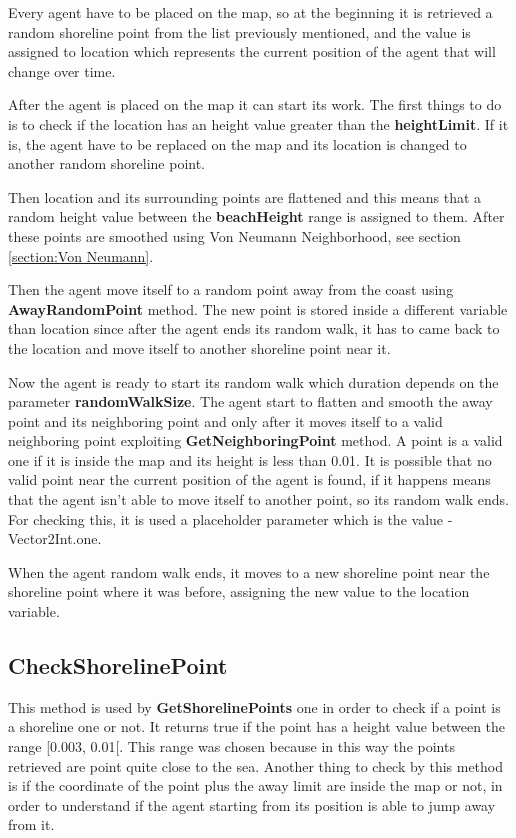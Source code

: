 \documentclass[12pt]{article}
\begin{document}
    Every agent have to be placed on the map, so at the beginning it is retrieved a random shoreline point from the list previously mentioned, and the value is assigned to location
    which represents the current position of the agent that will change over time.

    After the agent is placed on the map it can start its work. The first things to do is to check if the location has an height value greater than the \textbf{heightLimit}.
    If it is, the agent have to be replaced on the map and its location is changed to another random shoreline point.
    
    Then location and its surrounding points are flattened and this means that a random height value between the \textbf{beachHeight} range is assigned
    to them. After these points are smoothed using Von Neumann Neighborhood, see section \ref{section:Von Neumann}.

    Then the agent move itself to a random point away from the coast using \textbf{AwayRandomPoint} method. The new point is stored inside a different variable
    than location since after the agent ends its random walk, it has to came back to the location and move itself to another shoreline point near it.

    Now the agent is ready to start its random walk which duration depends on the parameter \textbf{randomWalkSize}. The agent start to flatten and smooth the away point
    and its neighboring point and only after it moves itself to a valid neighboring point exploiting \textbf{GetNeighboringPoint} method. A point is a valid one if it is 
    inside the map and its height is less than 0.01. It is possible that no valid point near the current position of the agent is found, if it happens means that the 
    agent isn't able to move itself to another point, so its random walk ends. For checking this, it is used a placeholder parameter which is the value -Vector2Int.one.

    When the agent random walk ends, it moves to a new shoreline point near the shoreline point where it was before, assigning the new value to the 
    location variable.

    \subsection{CheckShorelinePoint}
    This method is used by \textbf{GetShorelinePoints} one in order to check if a point is a shoreline one or not. It returns true if the point has a height value
    between the range [0.003, 0.01[. This range was chosen because in this way the points retrieved are point quite close to the sea. Another thing to check by this method is
    if the coordinate of the point plus the away limit are inside the map or not, in order to understand if the agent starting from its position is able to jump away from it.
\end{document}

